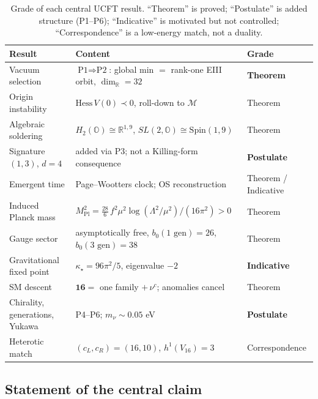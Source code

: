 \documentclass[11pt]{article}
\theoremstyle{plain}
\theoremstyle{definition}
\theoremstyle{remark}
\begin{document}
\begin{table}[t]
  \centering
  \begin{tabular}{@{}lll@{}}
    \hline
    Result & Content & Grade \\
    \hline
    Vacuum selection
      & $\text{P1}\Rightarrow\text{P2}$: global min $=$ rank-one EIII orbit, $\dim_{\mathbb{R}}=32$
      & \textbf{Theorem} \\
    Origin instability
      & $\mathrm{Hess}\,V(0)\prec 0$, roll-down to $\mathcal{M}$
      & Theorem \\
    Algebraic soldering
      & $H_2(\mathbb{O})\cong\mathbb{R}^{1,9}$, $SL(2,\mathbb{O})\cong\mathrm{Spin}(1,9)$
      & Theorem \\
    Signature $(1,3)$, $d=4$
      & added via P3; not a Killing-form consequence
      & \textbf{Postulate} \\
    Emergent time
      & Page--Wootters clock; OS reconstruction
      & Theorem / Indicative \\
    Induced Planck mass
      & $M_{\mathrm{Pl}}^{2}=\tfrac{28}{6}\,f^{2}\mu^{2}\log(\Lambda^{2}/\mu^{2})/(16\pi^{2})>0$
      & Theorem \\
    Gauge sector
      & asymptotically free, $b_0(\text{1 gen})=26$, $b_0(\text{3 gen})=38$
      & Theorem \\
    Gravitational fixed point
      & $\kappa_\star=96\pi^{2}/5$, eigenvalue $-2$
      & \textbf{Indicative} \\
    SM descent
      & $\mathbf{16}=$ one family $+\,\nu^{c}$; anomalies cancel
      & Theorem \\
    Chirality, generations, Yukawa
      & P4--P6; $m_\nu\sim 0.05$ eV
      & \textbf{Postulate} \\
    Heterotic match
      & $(c_L,c_R)=(16,10)$, $h^{1}(V_{16})=3$
      & Correspondence \\
    \hline
  \end{tabular}
  \caption{Grade of each central UCFT result. ``Theorem'' is proved;
    ``Postulate'' is added structure (P1--P6); ``Indicative'' is motivated but
    not controlled; ``Correspondence'' is a low-energy match, not a duality.}
  \label{tab:intro:grades}
\end{table}

\subsection{Statement of the central claim}
\label{sec:intro:claim}
\end{document}
